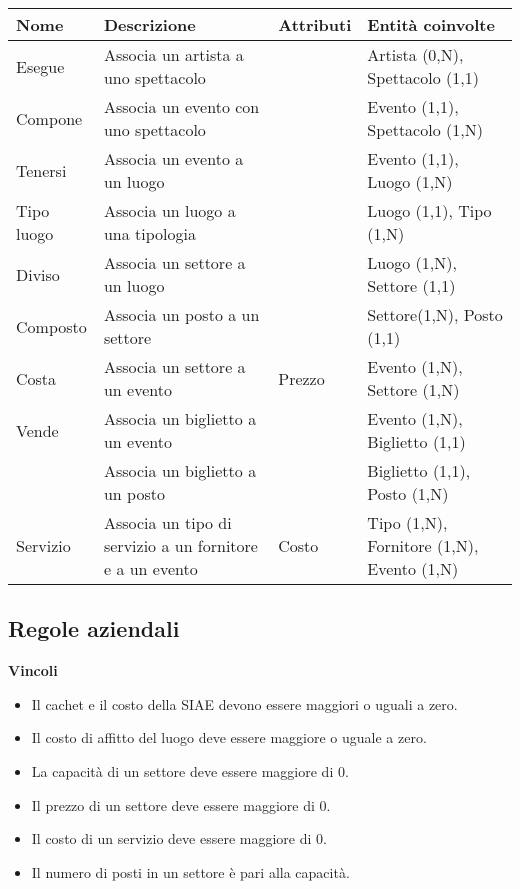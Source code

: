 \documentclass[a4paper,11pt]{article}
\begin{document}
\begin{tabularx}{\textwidth}{|X|>{\raggedright\arraybackslash}X|>{\raggedright\arraybackslash}X|>{\raggedright\arraybackslash}X|}
\hline
\textbf{Nome} & \textbf{Descrizione} & \textbf{Attributi} & \textbf{Entità coinvolte}\\
\hline
Esegue & Associa un artista a uno spettacolo & & Artista (0,N), Spettacolo (1,1)\\
\hline
Compone & Associa un evento con uno spettacolo & & Evento (1,1), Spettacolo (1,N)\\
\hline
Tenersi & Associa un evento a un luogo & & Evento (1,1), Luogo (1,N)\\
\hline
Tipo luogo & Associa un luogo a una tipologia & & Luogo (1,1), Tipo (1,N)\\
\hline
Diviso & Associa un settore a un luogo & & Luogo (1,N), Settore (1,1)\\
\hline
Composto & Associa un posto a un settore & & Settore(1,N), Posto (1,1)\\
\hline
Costa & Associa un settore a un evento & Prezzo & Evento (1,N), Settore (1,N)\\
\hline
Vende & Associa un biglietto a un evento & & Evento (1,N), Biglietto (1,1)\\
\hline
& Associa un biglietto a un posto & & Biglietto (1,1), Posto (1,N)\\
\hline
Servizio & Associa un tipo di servizio a un fornitore e a un evento & Costo & Tipo (1,N), Fornitore (1,N), Evento (1,N)\\
\hline
\end{tabularx}

\subsection{Regole aziendali}

\textbf{Vincoli}

\begin{itemize}
    \item Il cachet e il costo della SIAE devono essere maggiori o uguali a zero.
    \item Il costo di affitto del luogo deve essere maggiore o uguale a zero.
    \item La capacità di un settore deve essere maggiore di 0.
    \item Il prezzo di un settore deve essere maggiore di 0.
    \item Il costo di un servizio deve essere maggiore di 0.
    \item Il numero di posti in un settore è pari alla capacità.
\end{itemize}
\end{document}
